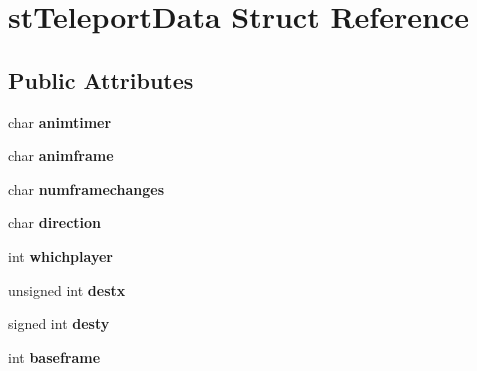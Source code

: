 \hypertarget{structst_teleport_data}{
\section{stTeleportData Struct Reference}
\label{structst_teleport_data}
}
\subsection*{Public Attributes}
\begin{DoxyCompactItemize}
\item 
\hypertarget{structst_teleport_data_a44b3dd7dc8b8a388a16c679041d09ebc}{
char {\bfseries animtimer}}
\label{structst_teleport_data_a44b3dd7dc8b8a388a16c679041d09ebc}

\item 
\hypertarget{structst_teleport_data_afd9c2765ab13a2efb952decd192aeef9}{
char {\bfseries animframe}}
\label{structst_teleport_data_afd9c2765ab13a2efb952decd192aeef9}

\item 
\hypertarget{structst_teleport_data_a088d605b6db2029665710c372b787f20}{
char {\bfseries numframechanges}}
\label{structst_teleport_data_a088d605b6db2029665710c372b787f20}

\item 
\hypertarget{structst_teleport_data_a8f711624e8ef06a4e32878a1e4ac9ab4}{
char {\bfseries direction}}
\label{structst_teleport_data_a8f711624e8ef06a4e32878a1e4ac9ab4}

\item 
\hypertarget{structst_teleport_data_acc92a8b98bd4e36ecca7640fb4364acc}{
int {\bfseries whichplayer}}
\label{structst_teleport_data_acc92a8b98bd4e36ecca7640fb4364acc}

\item 
\hypertarget{structst_teleport_data_a3dedea30b9904d380e470fd6b2c2582e}{
unsigned int {\bfseries destx}}
\label{structst_teleport_data_a3dedea30b9904d380e470fd6b2c2582e}

\item 
\hypertarget{structst_teleport_data_a4988eba476b3426009ea1ade3665ff91}{
signed int {\bfseries desty}}
\label{structst_teleport_data_a4988eba476b3426009ea1ade3665ff91}

\item 
\hypertarget{structst_teleport_data_ae9de4a111614a102eefb0266812c6827}{
int {\bfseries baseframe}}
\label{structst_teleport_data_ae9de4a111614a102eefb0266812c6827}


\end{DoxyCompactItemize}
